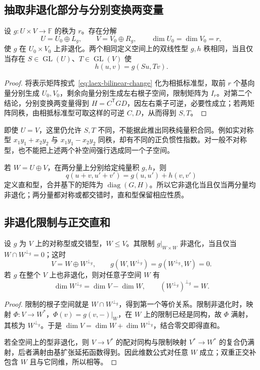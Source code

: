 \subsection{抽取非退化部分与分别变换两变量}

\begin{proposition}
\label{prop:laex-bilinear-core}
设 $g:U\times V\to\mathbb F$ 的秩为 $r$。存在分解
\[
 U=U_0\oplus L_g,\qquad V=V_0\oplus R_g,
 \qquad \dim U_0=\dim V_0=r,
\]
使 $g$ 在 $U_0\times V_0$ 上非退化。两个相同定义空间上的双线性型 $g,h$ 秩相同，当且仅当存在 $S\in\operatorname{GL}(U)$、$T\in\operatorname{GL}(V)$ 使
\[
 h(u,v)=g(Su,Tv).
\]
\end{proposition}
\begin{proof}
将表示矩阵按式~\eqref{eq:laex-bilinear-change} 化为相抵标准型，取前 $r$ 个基向量分别生成 $U_0,V_0$，剩余向量分别生成左右根子空间，限制矩阵为 $I_r$。对第二个结论，分别变换两变量得到 $H=C^{\mathsf T}GD$，因左右乘子可逆，必要性成立；若两矩阵同秩，由相抵标准型可取这样的可逆 $C,D$，从而得到 $S,T$。
\end{proof}

即使 $U=V$，这里仍允许 $S,T$ 不同，不能据此推出同秩纯量积合同。例如实对称型 $x_1y_1+x_2y_2$ 与 $x_1y_1-x_2y_2$ 同秩，却有不同的正负惯性指数。对一般不对称型，也不能把上述两个补空间强行选成同一个子空间。

若 $W=U\oplus V$，在两分量上分别给定纯量积 $g,h$，则
\[
 q(u+v,u'+v')=g(u,u')+h(v,v')
\]
定义直和型，合并基下的矩阵为 $\operatorname{diag}(G,H)$。所以它非退化当且仅当两分量均非退化；两分量都对称或都交错时，直和型保留相应性质。

\subsection{非退化限制与正交直和}

\begin{theorem}
\label{thm:laex-orthogonal-splitting}
设 $g$ 为 $V$ 上的对称型或交错型，$W\le V$。其限制 $g|_{W\times W}$ 非退化，当且仅当 $W\cap W^{\perp_g}=0$；这时
\begin{equation}
 V=W\oplus W^{\perp_g},\qquad g(W,W^{\perp_g})=g(W^{\perp_g},W)=0.
 \label{eq:laex-orthogonal-splitting}
\end{equation}
若 $g$ 在整个 $V$ 上也非退化，则对任意子空间 $W$ 有
\[
 \dim W^{\perp_g}=\dim V-\dim W,\qquad
 (W^{\perp_g})^{\perp_g}=W.
\]
\end{theorem}
\begin{proof}
限制的根子空间就是 $W\cap W^{\perp_g}$，得到第一个等价关系。限制非退化时，映射 $\Phi:V\to W^*$，$\Phi(v)=g(v,-)|_W$，在 $W$ 上的限制已经是同构，故 $\Phi$ 满射，其核为 $W^{\perp_g}$。于是 $\dim V=\dim W+\dim W^{\perp_g}$，结合零交即得直和。

若全空间上的型非退化，则 $V\to V^*$ 的配对同构与限制映射 $V^*\to W^*$ 的复合仍满射，后者满射由基扩张延拓函数得到。因此维数公式对任意 $W$ 成立；双重正交补包含 $W$ 且与它同维，所以相等。
\end{proof}

